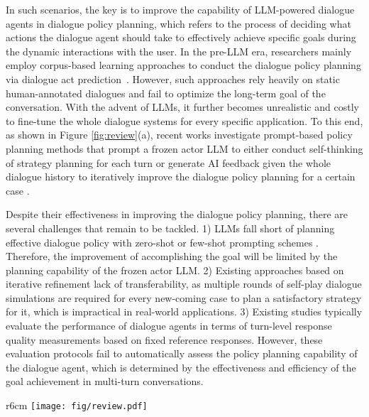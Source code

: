 \documentclass{article} %
\begin{document}
In such scenarios, the key is to improve the capability of LLM-powered dialogue agents in dialogue policy planning, which refers to the process of deciding what actions the dialogue agent should take to effectively achieve specific goals during the dynamic interactions with the user. 
In the pre-LLM era, researchers mainly employ corpus-based learning approaches to conduct the dialogue policy planning via dialogue act prediction~\citep{iclr20-noncollab,iclr21-negotiate-strategy,emnlp22-esc,eacl23-strategy-tutor}. However, such approaches rely heavily on static human-annotated dialogues and fail to optimize the long-term goal of the conversation. 
With the advent of LLMs, it further becomes unrealistic and costly to fine-tune the whole dialogue systems for every specific application. 
To this end, as shown in Figure \ref{fig:review}(a), recent works investigate prompt-based policy planning methods that prompt a frozen actor LLM to either conduct self-thinking of strategy planning for each turn \citep{acl23-askanexpert,llm-proactive} or generate AI feedback given the whole dialogue history to iteratively improve the dialogue policy planning for a certain case \citep{negotiate-selfplay,gdpzero}. 




Despite their effectiveness in improving the dialogue policy planning, there are several challenges that remain to be tackled. 
1) LLMs fall short of planning effective dialogue policy with zero-shot or few-shot prompting schemes \citep{llm-proactive}. Therefore, the improvement of accomplishing the goal will be limited by the planning capability of the frozen actor LLM. 
2) Existing approaches based on iterative refinement \citep{negotiate-selfplay,gdpzero} lack of transferability, as multiple rounds of self-play dialogue simulations are required for every new-coming case to plan a satisfactory strategy for it, which is impractical in real-world applications. 
3) Existing studies typically evaluate the performance of  dialogue agents in terms of turn-level response quality measurements based on fixed reference responses. However, these evaluation protocols fail to automatically assess the policy planning capability of the dialogue agent, which is determined by the effectiveness and efficiency of the goal achievement in multi-turn conversations. 


\begin{wrapfigure}{r}{6cm}
\setlength{\abovecaptionskip}{0pt}   
\vspace{-0.8cm}
\centering
\texttt{[image: fig/review.pdf]}
\caption{The architectures of two types of LLM-based proactive dialogue systems.} 
\vspace{-0.3cm}
\label{fig:review}
\end{wrapfigure}
\end{document}
